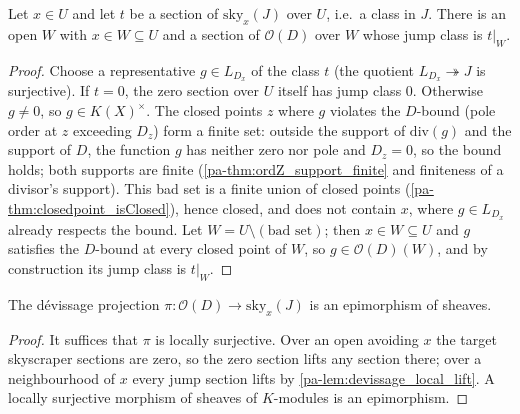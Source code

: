 \begin{lemma}
  \label{pa-lem:devissage_local_lift}
  \leanok

  Let \(x \in U\) and let \(t\) be a section of \(\mathrm{sky}_x(J)\) over \(U\), i.e.\ a class in
  \(J\). There is an open \(W\) with \(x \in W \subseteq U\) and a section of \(\mathcal O(D)\) over
  \(W\) whose jump class is \(t|_W\).
\end{lemma}
\begin{proof}
  \leanok
  Choose a representative \(g \in L_{D_x}\) of the class \(t\) (the quotient
  \(L_{D_x} \twoheadrightarrow J\) is surjective). If \(t = 0\), the zero section over \(U\) itself
  has jump class \(0\). Otherwise \(g \neq 0\), so \(g \in K(X)^\times\). The closed points \(z\)
  where \(g\) violates the \(D\)-bound (pole order at \(z\) exceeding \(D_z\)) form a finite set:
  outside the support of \(\mathrm{div}(g)\) and the support of \(D\), the function \(g\) has neither
  zero nor pole and \(D_z = 0\), so the bound holds; both supports are finite
  (\ref{pa-thm:ordZ_support_finite} and finiteness of a divisor's support). This bad set is a finite
  union of closed points (\ref{pa-thm:closedpoint_isClosed}), hence closed, and does not contain \(x\),
  where \(g \in L_{D_x}\) already respects the bound. Let \(W = U \setminus (\text{bad set})\); then
  \(x \in W \subseteq U\) and \(g\) satisfies the \(D\)-bound at every closed point of \(W\), so
  \(g \in \mathcal O(D)(W)\), and by construction its jump class is \(t|_W\).
\end{proof}

\begin{theorem}
  \label{pa-thm:devissageSES_epi_g}
  \leanok

  The dévissage projection \(\pi : \mathcal O(D) \to \mathrm{sky}_x(J)\) is an epimorphism of
  sheaves.
\end{theorem}
\begin{proof}
  \leanok
  It suffices that \(\pi\) is locally surjective. Over an open avoiding \(x\) the target skyscraper
  sections are zero, so the zero section lifts any section there; over a neighbourhood of \(x\)
  every jump section lifts by \ref{pa-lem:devissage_local_lift}. A locally surjective morphism of
  sheaves of \(K\)-modules is an epimorphism.
\end{proof}

